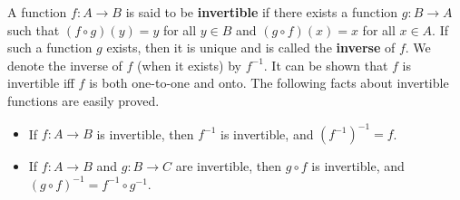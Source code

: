 \begin{defn}\label{b.0.6}
  A function \(f : A \to B\) is said to be \textbf{invertible} if there exists a function \(g : B \to A\) such that \((f \circ g)(y) = y\) for all \(y \in B\) and \((g \circ f)(x) = x\) for all \(x \in A\).
  If such a function \(g\) exists, then it is unique and is called the \textbf{inverse} of \(f\).
  We denote the inverse of \(f\) (when it exists) by \(f^{-1}\).
  It can be shown that \(f\) is invertible iff \(f\) is both one-to-one and onto.
  The following facts about invertible functions are easily proved.
  \begin{itemize}
    \item If \(f : A \to B\) is invertible, then \(f^{-1}\) is invertible, and \((f^{-1})^{-1} = f\).
    \item If \(f : A \to B\) and \(g : B \to C\) are invertible, then \(g \circ f\) is invertible, and \((g \circ f)^{-1} = f^{-1} \circ g^{-1}\).
  \end{itemize}
\end{defn}
